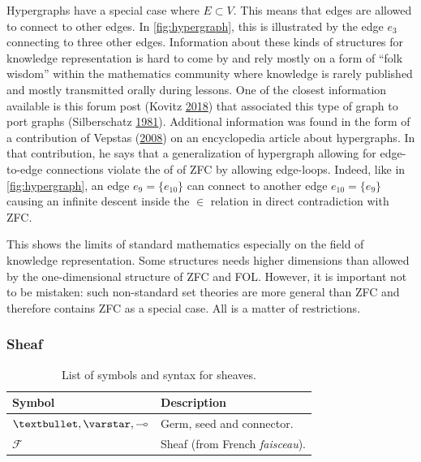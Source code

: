 \documentclass[11pt,a4paper,twoside,openright,titlepage,numbers=noenddot,headinclude,cleardoublepage=empty,openany]{scrreprt}
\theoremstyle{plain}
\theoremstyle{definition}
\theoremstyle{remark}
\renewcommand{\cal}{\mathcal}
\begin{document}
Hypergraphs have a special case where \(E \subset V\). This means that
edges are allowed to connect to other edges. In \cref{fig:hypergraph},
this is illustrated by the edge \(e_3\) connecting to three other edges.
Information about these kinds of structures for knowledge representation
is hard to come by and rely mostly on a form of ``folk wisdom'' within
the mathematics community where knowledge is rarely published and mostly
transmitted orally during lessons. One of the closest information
available is this forum post (Kovitz
\protect\hyperlink{ref-kovitz_terminology_2018}{2018}) that associated
this type of graph to port graphs (Silberschatz
\protect\hyperlink{ref-silberschatz_port_1981}{1981}). Additional
information was found in the form of a contribution of Vepstas
(\protect\hyperlink{ref-vepstas_hypergraph_2008}{2008}) on an
encyclopedia article about hypergraphs. In that contribution, he says
that a generalization of hypergraph allowing for edge-to-edge
connections violate the
 of  of ZFC by allowing
edge-loops. Indeed, like in \cref{fig:hypergraph}, an edge
\(e_9 = \{e_{10}\}\) can connect to another edge \(e_{10} = \{ e_9 \}\)
causing an infinite descent inside the \(\in\) relation in direct
contradiction with ZFC.

This shows the limits of standard mathematics especially on the field of
knowledge representation. Some structures needs higher dimensions than
allowed by the one-dimensional structure of ZFC and FOL. However, it is
important not to be mistaken: such non-standard set theories are more
general than ZFC and therefore contains ZFC as a special case. All is a
matter of restrictions.

\hypertarget{sheaf}{%
\subsubsection{Sheaf}\label{sheaf}}

\hypertarget{tbl:sheaf}{}
\begin{table}\footnotesize
\centering

\caption{\label{tbl:sheaf}List of symbols and syntax for sheaves.}

\begin{tabular}{@{}ll@{}}
\toprule

\textbf{Symbol} & \textbf{Description} \\\midrule

\(\textbullet, \varstar, \multimap\) & Germ, seed and connector. \\
\(\cal{F}\) & Sheaf (from French \emph{faisceau}). \\

\bottomrule
\end{tabular}

\end{table}
\end{document}

